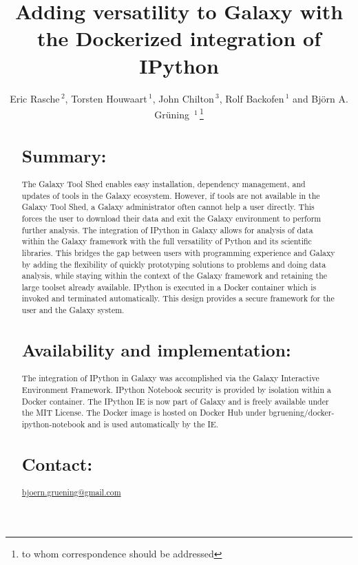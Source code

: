 \documentclass{bioinfo}
\begin{document}

\title[short Title]{Adding versatility to Galaxy with the Dockerized integration of IPython}
\author[Sample \textit{et~al}]{Eric Rasche\,$^{2}$, Torsten Houwaart\,$^{1}$, John Chilton\,$^{3}$, Rolf Backofen\,$^{1}$ and Bj\"orn A. Gr\"uning \,$^{1}$\,\footnote{to whom correspondence should be addressed}}
\address{$^{1}$Bioinformatics Group, Department of Computer Science, University of Freiburg\\
$^{2}$Center for Phage Technology, Texas A\&M University\\
$^{3}$Department of Biochemistry and Molecular Biology, Penn State University}




\maketitle

\begin{abstract}

\section{Summary:}
The Galaxy Tool Shed enables easy installation, dependency management, and updates of tools in the Galaxy ecosystem. 
However, if tools are not available in the Galaxy Tool Shed, a Galaxy administrator often cannot help a user directly. 
This forces the user to download their data and exit the Galaxy environment to perform further analysis. The integration of 
IPython in Galaxy allows for analysis of data within the Galaxy framework with the full versatility of Python and its 
scientific libraries. This bridges the gap between users with programming experience and Galaxy by adding the flexibility 
of quickly prototyping solutions to problems and doing data analysis, while staying within the context of the Galaxy 
framework and retaining the large toolset already available. IPython is executed in a Docker container which is 
invoked and terminated automatically. This design provides a secure framework for the user and the Galaxy system.


\section{Availability and implementation:}
The integration of IPython in Galaxy was accomplished via the Galaxy Interactive Environment Framework. 
IPython Notebook security is provided by isolation within a Docker container. The IPython IE
is now part of Galaxy and is freely available under the MIT License. The Docker image is hosted on Docker Hub under bgruening/docker-ipython-notebook and is used automatically by the IE.

\section{Contact:} \href{bjoern.gruening@gmail.com}{bjoern.gruening@gmail.com}
\end{abstract}
\end{document}
